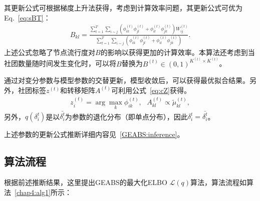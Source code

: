 其更新公式可根据梯度上升法获得，考虑到计算效率问题，其更新公式可优为Eq.~\ref{eq:sBT}：
\begin{equation}
\begin{split}
{B}_{kl}= \frac{\sum_{t=1}^{T} \sum_{i \sim j} (\phi_{ik}^{(t)}\phi_{jl}^{(t)}+ \phi_{il}^{(t)}\phi_{jk}^{(t)}) W^{(t)}_{ij}}{\sum_{t=1}^{T} \sum_{i \sim j} (\phi_{ik}^{(t)}\phi_{jl}^{(t)}+ \phi_{il}^{(t)}\phi_{jk}^{(t)}) }.
\end{split}
\label{eq:sBT}
\end{equation}
上述公式忽略了节点流行度对$B$的影响以获得更加的计算效率。本算法还考虑到当社团数量随时间发生变化时，可以将$B$替换为$B^{(t)} \in (0, 1)^{K^{(t)} \times K^{(t)}}$。

通过对变分参数与模型参数的交替更新，模型收敛后，可以获得最优拟合结果。另外，社团标签$z^{(t)}$和转移矩阵$A^{(t)}$可利用公式~\ref{eq:cZ}获得。
\begin{equation}
\begin{split}
z^{(t)}_i = \arg \max_k \phi_{ik}^{(t)}, ~~~A_{kl}^{(t)} \propto \tilde{\mu}_{kl}^{(t)},
\end{split}
\label{eq:cZ}
\end{equation}
另外，$q(\delta_i^t)$是以$\bar{\delta_i^t}$为参数的退化分布（即单点分布），因此$\delta_i^t = \bar{\delta_i^t}$。

上述参数的更新公式推断详细内容见~\ref{GEABS:inference}。

\subsection{算法流程}
根据前述推断结果，这里提出GEABS的最大化ELBO $\mathscr{L}(q)$算法，算法流程如算法~\ref{chap4:alg1}所示：

